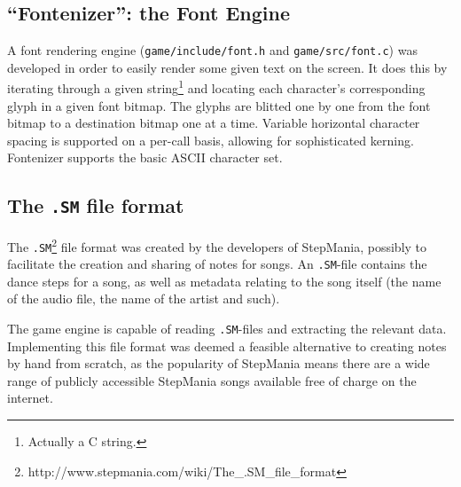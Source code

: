 \subsection{``Fontenizer'': the Font Engine}
	A font rendering engine (\texttt{game/include/font.h} and \texttt{game/src/font.c}) was developed in order to easily render some given text on the screen.
	It does this by iterating through a given string\footnote{Actually a C string.} and locating each character's corresponding glyph in a given font bitmap.
	The glyphs are blitted one by one from the font bitmap to a destination bitmap one at a time.
    Variable horizontal character spacing is supported on a per-call basis, allowing for sophisticated kerning.
    Fontenizer supports the basic ASCII character set.
        
\subsection{The \texttt{.SM} file format}
The \texttt{.SM}\footnote{http://www.stepmania.com/wiki/The_.SM_file_format} file format was created by the developers of StepMania, possibly to facilitate the creation and sharing of notes for songs.
An \texttt{.SM}-file contains the dance steps for a song, as well as metadata relating to the song itself (the name of the audio file, the name of the artist and such).

The game engine is capable of reading \texttt{.SM}-files and extracting the relevant data.
Implementing this file format was deemed a feasible alternative to creating notes by hand from scratch, as the popularity of StepMania means there are a wide range of publicly accessible StepMania songs available free of charge on the internet.